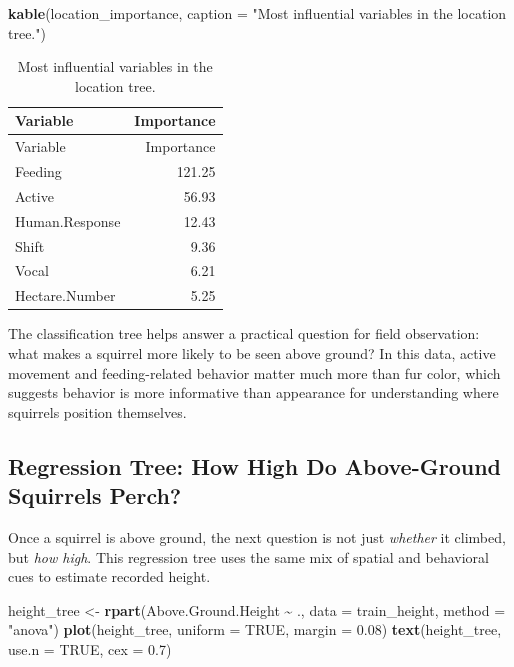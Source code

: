 \documentclass[
  11pt,
]{article}
\newenvironment{Shaded}{\begin{snugshade}}{\end{snugshade}}
\newcommand{\AttributeTok}[1]{\textcolor[rgb]{0.13,0.29,0.53}{#1}}
\newcommand{\ConstantTok}[1]{\textcolor[rgb]{0.56,0.35,0.01}{#1}}
\newcommand{\FloatTok}[1]{\textcolor[rgb]{0.00,0.00,0.81}{#1}}
\newcommand{\FunctionTok}[1]{\textcolor[rgb]{0.13,0.29,0.53}{\textbf{#1}}}
\newcommand{\NormalTok}[1]{#1}
\newcommand{\OtherTok}[1]{\textcolor[rgb]{0.56,0.35,0.01}{#1}}
\newcommand{\SpecialCharTok}[1]{\textcolor[rgb]{0.81,0.36,0.00}{\textbf{#1}}}
\newcommand{\StringTok}[1]{\textcolor[rgb]{0.31,0.60,0.02}{#1}}
\begin{document}
\begin{Shaded}
\begin{Highlighting}[]
\FunctionTok{kable}\NormalTok{(location\_importance, }\AttributeTok{caption =} \StringTok{"Most influential variables in the location tree."}\NormalTok{)}
\end{Highlighting}
\end{Shaded}

\begin{longtable}[]{@{}lr@{}}
\caption{Most influential variables in the location
tree.}\tabularnewline
\toprule\noalign{}
Variable & Importance \\
\midrule\noalign{}
\endfirsthead
\toprule\noalign{}
Variable & Importance \\
\midrule\noalign{}
\endhead
\bottomrule\noalign{}
\endlastfoot
Feeding & 121.25 \\
Active & 56.93 \\
Human.Response & 12.43 \\
Shift & 9.36 \\
Vocal & 6.21 \\
Hectare.Number & 5.25 \\
\end{longtable}

The classification tree helps answer a practical question for field
observation: what makes a squirrel more likely to be seen above ground?
In this data, active movement and feeding-related behavior matter much
more than fur color, which suggests behavior is more informative than
appearance for understanding where squirrels position themselves.

\subsection{Regression Tree: How High Do Above-Ground Squirrels
Perch?}\label{regression-tree-how-high-do-above-ground-squirrels-perch}

Once a squirrel is above ground, the next question is not just
\emph{whether} it climbed, but \emph{how high}. This regression tree
uses the same mix of spatial and behavioral cues to estimate recorded
height.

\begin{Shaded}
\begin{Highlighting}[]
\NormalTok{height\_tree }\OtherTok{\textless{}{-}} \FunctionTok{rpart}\NormalTok{(Above.Ground.Height }\SpecialCharTok{\textasciitilde{}}\NormalTok{ ., }\AttributeTok{data =}\NormalTok{ train\_height, }\AttributeTok{method =} \StringTok{"anova"}\NormalTok{)}
\FunctionTok{plot}\NormalTok{(height\_tree, }\AttributeTok{uniform =} \ConstantTok{TRUE}\NormalTok{, }\AttributeTok{margin =} \FloatTok{0.08}\NormalTok{)}
\FunctionTok{text}\NormalTok{(height\_tree, }\AttributeTok{use.n =} \ConstantTok{TRUE}\NormalTok{, }\AttributeTok{cex =} \FloatTok{0.7}\NormalTok{)}
\end{Highlighting}
\end{Shaded}
\end{document}

